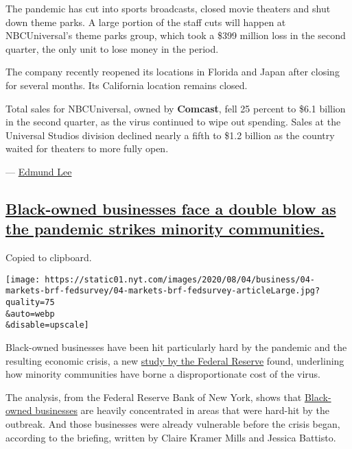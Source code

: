 The pandemic has cut into sports broadcasts, closed movie theaters and
shut down theme parks. A large portion of the staff cuts will happen at
NBCUniversal's theme parks group, which took a \$399 million loss in the
second quarter, the only unit to lose money in the period.

The company recently reopened its locations in Florida and Japan after
closing for several months. Its California location remains closed.

Total sales for NBCUniversal, owned by \textbf{Comcast}, fell 25 percent
to \$6.1 billion in the second quarter, as the virus continued to wipe
out spending. Sales at the Universal Studios division declined nearly a
fifth to \$1.2 billion as the country waited for theaters to more fully
open.

--- \href{https://www.nytimes.com/by/edmund-lee}{Edmund Lee}

\hypertarget{black-owned-businesses-face-a-double-blow-as-the-pandemic-strikes-minority-communities}{%
\subsection{\texorpdfstring{\protect\hyperlink{black-owned-businesses-face-a-double-blow-as-the-pandemic-strikes-minority-communities}{Black-owned
businesses face a double blow as the pandemic strikes minority
communities.}}{Black-owned businesses face a double blow as the pandemic strikes minority communities.}}\label{black-owned-businesses-face-a-double-blow-as-the-pandemic-strikes-minority-communities}}

Copied to clipboard.

\texttt{[image: https://static01.nyt.com/images/2020/08/04/business/04-markets-brf-fedsurvey/04-markets-brf-fedsurvey-articleLarge.jpg?quality=75\\\&auto=webp\\\&disable=upscale]}

Black-owned businesses have been hit particularly hard by the pandemic
and the resulting economic crisis, a new
\href{https://www.newyorkfed.org/smallbusiness/small-business-credit-survey-2020}{study
by the Federal Reserve} found, underlining how minority communities have
borne a disproportionate cost of the virus.

The analysis, from the Federal Reserve Bank of New York, shows that
\href{https://www.nytimes.com/interactive/2020/06/18/us/coronavirus-black-owned-small-business.html}{Black-owned
businesses} are heavily concentrated in areas that were hard-hit by the
outbreak. And those businesses were already vulnerable before the crisis
began, according to the briefing, written by Claire Kramer Mills and
Jessica Battisto.

